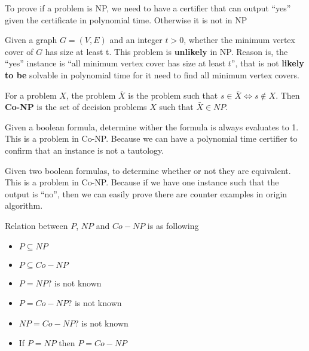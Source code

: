 
				To prove if a problem is NP, we need to have a certifier that can output ``yes'' given the certificate in polynomial time. Otherwise it is not in NP

				\begin{example}
					Given a graph $G = (V, E)$ and an integer $t > 0$, whether the minimum vertex cover of $G$ has size at least t. This problem is \textbf{unlikely} in NP. Reason is, the ``yes'' instance is ``all minimum vertex cover has size at least $t$'', that is not \textbf{likely to be} solvable in polynomial time for it need to find all minimum vertex covers.
				\end{example}

				\begin{definition}[Co-NP]
					For a problem $X$, the problem $\bar{X}$ is the problem such that $s \in \bar{X} \iff s \notin X$. Then \textbf{Co-NP} is the set of decision problems $X$ such that $\bar{X} \in NP$.
				\end{definition}

				\begin{example}
					Given a boolean formula, determine wither the formula is always evaluates to 1. This is a problem in Co-NP. Because we can have a polynomial time certifier to confirm that an instance is not a tautology.
				\end{example}

				\begin{example}
					Given two boolean formulas, to determine whether or not they are equivalent. This is a problem in Co-NP. Because if we have one instance such that the output is ``no'', then we can easily prove there are counter examples in origin algorithm.
				\end{example}


				Relation between $P$, $NP$ and $Co-NP$ is as following
				\begin{itemize}
					\item $P \subseteq NP$
					\item $P \subseteq Co-NP$
					\item $P = NP?$ is not known
					\item $P = Co-NP?$ is not known
					\item $NP = Co-NP?$ is not known
					\item If $P = NP$ then $P = Co-NP$
				\end{itemize}

